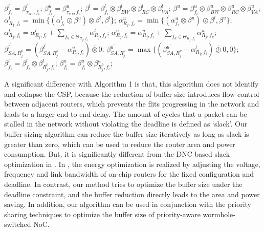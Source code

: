 \documentclass[10pt,journal]{IEEEtran}
\begin{document}
\begin{algorithm}
\begin{algorithmic}[1]
            \ENDIF
        \ENDFOR
        \STATE $\beta_{f_i}^l=\beta_{\tau_{src},f_i}^l$; $\beta_{f_i}^u=\beta_{\tau_{src},f_i}^u$;
                \STATE $\beta^l=\beta^l_{f_i}\otimes\beta_{BW}^l\otimes\beta_{RC}^l\otimes\beta_{VA}^l$;
                \STATE $\beta^u=\beta^u_{f_i}\otimes\beta_{BW}^u\otimes\beta_{RC}^u\otimes\beta_{VA}^u$;
                \STATE $\alpha^l_{R_j,f_i}=\min\{(\alpha^l_{f_i}\oslash\beta^u)\otimes\beta^l,\beta^l\}$;
                \STATE $\alpha^u_{R_j,f_i}=\min\{(\alpha^u_{f_i}\otimes\beta^u)\oslash\beta^l,\beta^u\}$;
                    \STATE $\alpha^l_{R_j,f_i}=\alpha^l_{R_j,f_i}+\sum_{f_k\in\Theta_{R_j,f_i}}\alpha^l_{R_j,f_k}$;
                    \STATE $\alpha^u_{R_j,f_i}=\alpha^u_{R_j,f_i}+\sum_{f_k\in\Theta_{R_j,f_i}}\alpha^u_{R_j,f_k}$;
                    \STATE $\beta^{l^\prime}_{SA,R_j^{p}}=(\beta^{l^\prime}_{SA,R_j^{p}}-\alpha^u_{R_j,f_i})\bar{\otimes}0$;
                    \STATE $\beta^{u^\prime}_{SA,R_j^{p}}=\max\{(\beta^{u^\prime}_{SA,R_j^{p}}-\alpha^l_{R_j,f_i})\bar{\oslash}0,0\}$;
                \ENDIF
            \ENDIF
            \STATE $\beta_{f_i}^l=\beta_{f_i}^l\otimes\beta^l_{R_j^{p},f_i}$; $\beta_{f_i}^u=\beta_{f_i}^u\otimes\beta^u_{R_j^{p},f_i}$;
        \ENDFOR
    \ENDFOR
\end{algorithmic}
\end{algorithm}

A significant difference with Algorithm 1 is that, this algorithm does not identify and collapse the CSP, because the reduction of buffer size introduces flow control between adjacent routers, which prevents the flits progressing in the network and leads to a larger end-to-end delay. The amount of cycles that a packet can be stalled in the network without violating the deadline is defined as `slack'. Our buffer sizing algorithm can reduce the buffer size iteratively as long as slack is greater than zero, which can be used to reduce the router area and power consumption. But, it is significantly different from the DNC based slack optimization in \cite{6560630}. In \cite{6560630}, the energy optimization is realized by adjusting the voltage, frequency and link bandwidth of on-chip routers for the fixed configuration and deadline. In contrast, our method tries to optimize the buffer size under the deadline constraint, and the buffer reduction directly leads to the area and power saving. In addition, our algorithm can be used in conjunction with the priority sharing techniques \cite{5161497} to optimize the buffer size of priority-aware wormhole-switched NoC.
\end{document}
